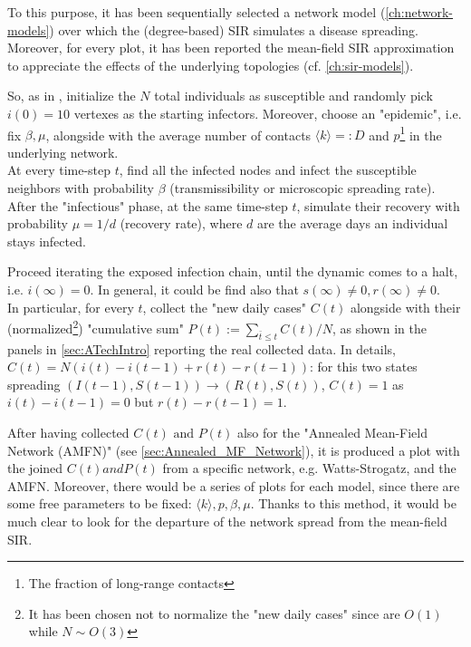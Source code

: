 \documentclass[a4paper,12pt,twoside]{book} %
\theoremstyle{definition}
\begin{document}
To this purpose, it has been sequentially selected a network model (\autoref{ch:network-models}) over which the (degree-based) SIR simulates a disease spreading. Moreover, for every plot, it has been reported the mean-field SIR approximation to appreciate the effects of the underlying topologies (cf. \autoref{ch:sir-models}).

So, as in \cite{Thurner::NetBasedExpl}, initialize the $N$ total individuals as susceptible and randomly pick $i(0) = 10$ vertexes as the starting infectors. Moreover, choose an "epidemic", i.e. fix $\beta, \mu$, alongside with the average number of contacts $\langle k \rangle =:D$ and $p$\footnote{The fraction of long-range contacts} in the underlying network. 
\\At every time-step $t$, find all the infected nodes and infect the susceptible neighbors with probability $\beta$ (transmissibility or microscopic spreading rate). After the "infectious" phase, at the same time-step $t$, simulate their recovery with probability $\mu = 1/d$ (recovery rate), where $d$ are the average days an individual stays infected.

\noindent{}

Proceed iterating the exposed infection chain, until the dynamic comes to a halt, i.e. $i(\infty)=0$. In general, it could be find also that $s(\infty)\neq0, r(\infty) \neq0$. 
\\In particular, for every $t$, collect the "new daily cases" $C(t)$ alongside with their (normalized\footnote{It has been chosen not to normalize the "new daily cases" since are $O(1)$ while $N\sim O(3)$}) "cumulative sum" $P(t):=\sum_{\bar{t}\leq t} C(t)/N$, as shown in the panels in \autoref{sec:ATechIntro} reporting the real collected data. In details, $C(t) = N(i(t) - i(t-1) + r(t) - r(t-1))$: for this two states spreading $(I(t-1),S(t-1)) \to (R(t),S(t))$, $C(t) = 1$ as $i(t)-i(t-1)=0$ but $r(t)-r(t-1) = 1$.

After having collected $C(t) \text{ and } P(t)$ also for the "Annealed Mean-Field Network (AMFN)" (see \autoref{sec:Annealed_MF_Network}), it is produced a plot with the joined $C(t) and P(t)$ from a specific network, e.g. Watts-Strogatz, and the AMFN. Moreover, there would be a series of plots for each model, since there are some free parameters to be fixed: $ \langle k \rangle, p, \beta,\mu$. Thanks to this method, it would be much clear to look for the departure of the network spread from the mean-field SIR.
\end{document}
